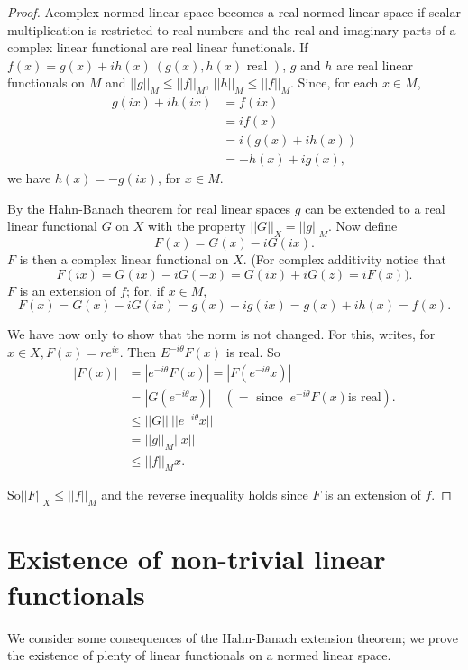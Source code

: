 \begin{proof}
 A\pageoriginale complex normed linear space becomes a real normed linear space if
 scalar multiplication is restricted to real numbers and the real and
 imaginary parts of a complex linear functional are real linear
 functionals. If $f(x) = g(x) + ih(x)~ (g(x), h(x) \text{ real })$,
 $g$ and $h$ are real linear functionals on $M$ and $|| g ||_M \le
 ||f||_M$, $||h||_M \le ||f||_M$. Since, for each $x \in M$, 
 \begin{align*}
  g(ix) + ih(ix) & = f(ix)\\
  & = if(x)\\
  & = i(g(x) + ih(x))\\
  & = -h (x) + ig(x),
 \end{align*}
 we have $h(x) = -g(ix)$, for $x \in M $. 
 
 By the Hahn-Banach theorem for real linear spaces $g$ can be
 extended to a real linear functional $G$ on $X$ with the property
 $|| G ||_X = || g ||_M$. Now define 
 $$
 F(x) =G(x) - iG(ix).
 $$
 $F$ is then a complex linear functional on $X$. (For complex additivity notice that 
 $$
 F (ix) = G(ix ) - iG (-x ) = G(ix ) + iG(z) = iF (x )).
 $$
 $F$ is an extension of $f$; for, if $x \in M$, 
 $$
 F(x) = G(x) - iG(ix) = g(x) - ig(ix) = g(x) + ih(x) = f(x).
 $$
 
 We have now only to show that the norm is not changed. For this,
 writes, for $x \in X, F(x) = re^{ie}$. Then $E^{-i\theta}F(x)$ is
 real. So 
 \begin{align*}
  |F(x)| & = |e^{-i\theta} F(x)| = |F(e^{-i\theta} x)|\\
  & = |G(e^{-i\theta} x)| \quad (=\text{ since }~ e^{-i\theta} F(x)
  \text{is real}).\\ 
  & \le || G ||~ || e^{-i\theta} x||\\
  & = || g ||_M ||x||\\
  & \le ||f ||_M x. 
 \end{align*}
 
 So\pageoriginale $|| F ||_X \le ||f||_M$ and the reverse inequality holds since
 $F$ is an extension of $f$. 
\end{proof}

\section{Existence of non-trivial linear functionals}\label{chap2:sec6}

We consider some consequences of the Hahn-Banach extension theorem; we
prove the existence of plenty of linear functionals on a normed linear
space. 

